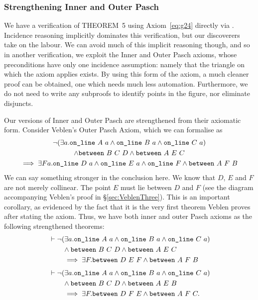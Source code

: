 \subsubsection{Strengthening Inner and Outer Pasch}\label{sec:StrengthenedPasch}
We have a verification of THEOREM~5 using Axiom~\ref{eq:g24} directly via . Incidence reasoning implicitly dominates this verification, but our discoverers take on the labour. We can avoid much of this implicit reasoning though, and so in another verification, we exploit the Inner and Outer Pasch axioms, whose preconditions have only one incidence assumption: namely that the triangle on which the axiom applies exists. By using this form of the axiom, a much cleaner proof can be obtained, one which needs much less automation. Furthermore, we do not need to write any subproofs to identify points in the figure, nor eliminate disjuncts.

Our versions of Inner and Outer Pasch are strengthened from their axiomatic form. Consider Veblen's Outer Pasch Axiom, which we can formalise as
\begin{multline*}
  \neg(\exists a.\texttt{on\_line}\ A\ a\wedge \texttt{on\_line}\ B\ a\wedge \texttt{on\_line}\ C\ a) \\\wedge \texttt{between}\ B\ C\ D \wedge \texttt{between}\ A\ E\ C\\ \implies \exists F a.  \texttt{on\_line}\ D\ a \wedge \texttt{on\_line}\ E\ a \wedge \texttt{on\_line}\ F \wedge \texttt{between}\ A\ F\ B
\end{multline*}
We can say something stronger in the conclusion here. We know that $D$, $E$ and $F$ are not merely collinear. The point $E$ must lie between $D$ and $F$ (see the diagram accompanying Veblen's proof in \S\ref{sec:VeblenThree}). This is an important corollary, as evidenced by the fact that it is the very first theorem Veblen proves after stating the axiom. Thus, we have both inner and outer Pasch axioms as the following strengthened theorems:
\begin{equation}\label{eq:OuterPasch}
  \begin{split}
    &\vdash\neg(\exists a.\texttt{on\_line}\ A\ a\wedge \texttt{on\_line}\ B\ a\wedge \texttt{on\_line}\ C\ a) \\
    &\qquad\wedge \texttt{between}\ B\ C\ D\wedge \texttt{between}\ A\ E\ C\\
    &\qquad\implies \exists F. \texttt{between}\ D\ E\ F \wedge \texttt{between}\ A\ F\ B
  \end{split}
\end{equation}
\begin{equation}\label{eq:InnerPasch}
  \begin{split}
    &\vdash\neg(\exists a.\texttt{on\_line}\ A\ a\wedge \texttt{on\_line}\ B\ a\wedge \texttt{on\_line}\ C\ a) \\
    &\qquad\wedge \texttt{between}\ B\ C\ D \wedge \texttt{between}\ A\ E\ B\\ 
    &\qquad\implies \exists F. \texttt{between}\ D\ F\ E \wedge \texttt{between}\ A\ F\ C.
  \end{split}
\end{equation}

